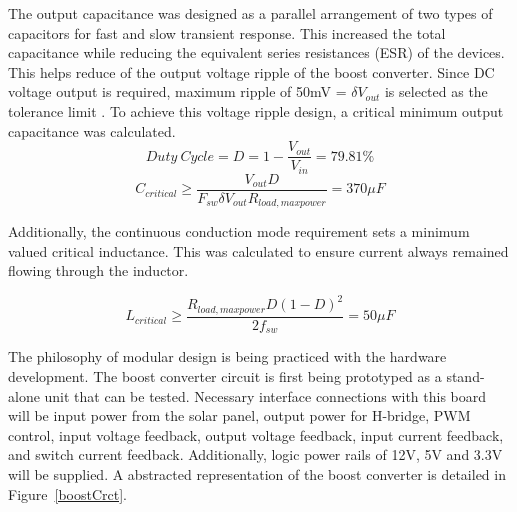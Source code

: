 	The output capacitance was designed as a parallel arrangement of two types  of capacitors for fast and slow transient response. This increased the total capacitance while reducing the equivalent series resistances (ESR) of the devices. This helps reduce of the output voltage ripple of the boost converter. Since DC voltage output is required, maximum ripple of 50mV = $\delta V_{out}$ is selected as the tolerance limit . To achieve this voltage ripple design, a critical minimum output capacitance was calculated.\cite{hasaneen}
\begin{equation}
Duty~Cycle = D= 1 - \frac{V_{out}}{V_{in}} = 79.81\% 
\end{equation}
\begin{equation}
C_{critical} \ge \frac{V_{out}D}{F_{sw}\delta V_{out}R_{load,maxpower}} = 370 \mu F
\end{equation}

Additionally, the continuous conduction mode requirement sets a minimum valued critical inductance. This was calculated to ensure current always remained flowing through the inductor.\cite{hasaneen}

\begin{equation}
 L_{critical} \ge \frac{R_{load,maxpower}D(1-D)^2}{2f_{sw}}= 50 \mu F
\end{equation}

The philosophy of modular design is being practiced with the hardware development.  The boost converter circuit is first being prototyped as a stand-alone unit that can be tested. Necessary interface connections  with this board will be input power from the solar panel, output power for H-bridge, PWM control, input voltage feedback, output voltage feedback, input current feedback, and switch current feedback. Additionally, logic power rails of 12V, 5V and 3.3V will be supplied. A abstracted representation of the boost converter is detailed in Figure~\ref{boostCrct}. 


